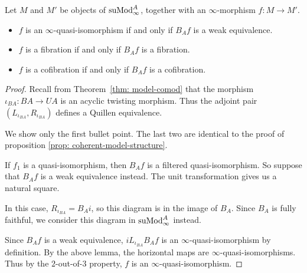 \documentclass[../thesis.tex]{subfiles}
\begin{document}
            \begin{proposition}
                Let $M$ and $M'$ be objects of $\tt{suMod}_\infty^A$, together with an $\infty$-morphism $f : M \to M'$.
                \begin{itemize}
                    \item $f$ is an $\infty$-quasi-isomorphism if and only if $B_Af$ is a weak equivalence.
                    \item $f$ is a fibration if and only if $B_Af$ is a fibration.
                    \item $f$ is a cofibration if and only if $B_Af$ is a cofibration.
                \end{itemize}
            \end{proposition}

            \begin{proof}
                Recall from Theorem~\ref{thm: model-comod} that the morphism $\iota_{BA}: BA \to UA$ is an acyclic twisting morphism. Thus the adjoint pair $(L_{\iota_{BA}}, R_{\iota_{BA}})$ defines a Quillen equivalence.

                We show only the first bullet point. The last two are identical to the proof of proposition \ref{prop: coherent-model-structure}.

                If $f_1$ is a quasi-isomorphism, then $B_Af$ is a filtered quasi-isomorphism. So suppose that $B_Af$ is a weak equivalence instead. The unit transformation gives us a natural square.

                \begin{center}
                \end{center}

                In this case, $R_{\iota_{BA}} = B_Ai$, so this diagram is in the image of $B_A$. Since $B_A$ is fully faithful, we consider this diagram in $\tt{suMod}_\infty^A$ instead.

                \begin{center}
                \end{center}

                Since $B_Af$ is a weak equivalence, $iL_{\iota_{BA}}B_Af$ is an $\infty$-quasi-isomorphism by definition. By the above lemma, the horizontal maps are $\infty$-quasi-isomorphisms. Thus by the $2$-out-of-$3$ property, $f$ is an $\infty$-quasi-isomorphism.
            \end{proof}
\end{document}
